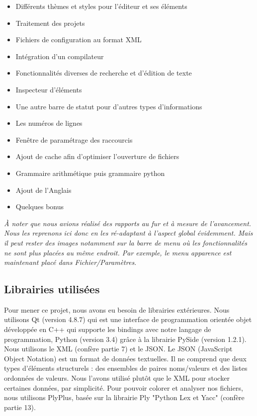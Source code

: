 \documentclass[a4paper,12pt]{article}
\begin{document}
		\begin{itemize}
			\item Différents thèmes et styles pour l'éditeur et ses éléments
			\item Traitement des projets
			\item Fichiers de configuration au format XML
			\item Intégration d'un compilateur
			\item Fonctionnalités diverses de recherche et d'édition de texte
			\item Inspecteur d'éléments
			\item Une autre barre de statut pour d'autres types d'informations
			\item Les numéros de lignes
			\item Fenêtre de paramétrage des raccourcis
			\item Ajout de cache afin d'optimiser l'ouverture de fichiers
			\item Grammaire arithmétique puis grammaire python
			\item Ajout de l'Anglais
			\item Quelques bonus \\
		\end{itemize}
		
		\textit{À noter que nous avions réalisé des rapports au fur et à mesure de l'avancement. Nous les reprenons ici donc en les ré-adaptant à l'aspect global évidemment. Mais il peut rester des images notamment sur la barre de menu où les fonctionnalités ne sont plus placées au même endroit. Par exemple, le menu apparence est maintenant placé dans Fichier/Paramètres.}
		
	\subsection{Librairies utilisées}

Pour mener ce projet, nous avons eu besoin de librairies extérieures. Nous utilisons Qt (version 4.8.7) qui est une interface de programmation orientée objet développée en C++ qui supporte les bindings avec notre langage de programmation, Python (version 3.4) grâce à la librairie PySide (version 1.2.1).
Nous utilisons le XML (confère partie 7) et le JSON. Le JSON (JavaScript Object Notation) est un format de données textuelles. Il ne comprend que deux types d'éléments structurels : des ensembles de paires noms/valeurs et des listes ordonnées de valeurs. Nous l'avons utilisé plutôt que le XML pour stocker certaines données, par simplicité.
Pour pouvoir colorer et analyser nos fichiers, nous utilisons PlyPlus, basée sur la librairie Ply "Python Lex et Yacc" (confère partie 13).
\end{document}
